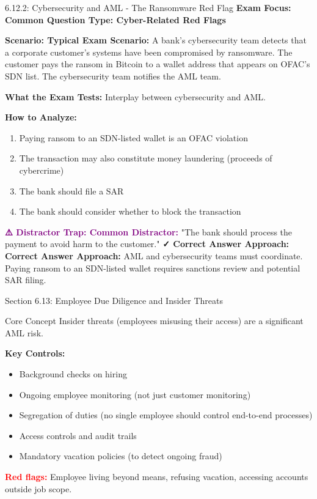 \documentclass[11pt,a4paper]{beamer}
\newcommand{\redflag}[1]{\textcolor{red}{\textbf{#1}}}
\newcommand{\examfocus}[1]{\textcolor{orange!80!black}{\textbf{Exam Focus: #1}}}
\newcommand{\trap}[1]{\textcolor{purple}{\textbf{⚠️ Distractor Trap: #1}}}
\newcommand{\correct}[1]{\textcolor{green!50!black}{\textbf{✓ Correct Answer Approach: #1}}}
\newcommand{\scenario}[1]{\textcolor{blue!70!black}{\textbf{Scenario: #1}}}
\begin{document}
	\begin{frame}{6.12.2: Cybersecurity and AML - The Ransomware Red Flag}
		\examfocus{Common Question Type: Cyber-Related Red Flags}
		
		\scenario{Typical Exam Scenario:}
		A bank's cybersecurity team detects that a corporate customer's systems have been compromised by ransomware. The customer pays the ransom in Bitcoin to a wallet address that appears on OFAC's SDN list. The cybersecurity team notifies the AML team.
		
		\textbf{What the Exam Tests:} Interplay between cybersecurity and AML.
		
		\textbf{How to Analyze:}
		\begin{enumerate}
			\item Paying ransom to an SDN-listed wallet is an OFAC violation
			\item The transaction may also constitute money laundering (proceeds of cybercrime)
			\item The bank should file a SAR
			\item The bank should consider whether to block the transaction
		\end{enumerate}
		
		\trap{Common Distractor:} "The bank should process the payment to avoid harm to the customer."
		\correct{Correct Answer Approach:} AML and cybersecurity teams must coordinate. Paying ransom to an SDN-listed wallet requires sanctions review and potential SAR filing.
	\end{frame}
	
	
	\begin{frame}{Section 6.13: Employee Due Diligence and Insider Threats}
		\begin{block}{Core Concept}
			Insider threats (employees misusing their access) are a significant AML risk.
		\end{block}
		\textbf{Key Controls:}
		\begin{itemize}
			\item Background checks on hiring
			\item Ongoing employee monitoring (not just customer monitoring)
			\item Segregation of duties (no single employee should control end-to-end processes)
			\item Access controls and audit trails
			\item Mandatory vacation policies (to detect ongoing fraud)
		\end{itemize}
		\redflag{Red flags:} Employee living beyond means, refusing vacation, accessing accounts outside job scope.
	\end{frame}
	
\end{document}
